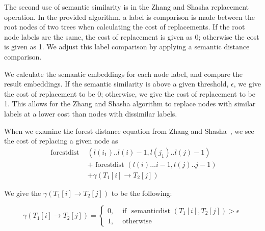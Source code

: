 The second use of semantic similarity is in the Zhang and Shasha replacement operation. In the provided algorithm, a label is comparison is made between the root nodes of two trees when calculating the cost of replacements. If the root node labels are the same, the cost of replacement is given as 0; otherwise the cost is given as 1. We adjust this label comparison by applying a semantic distance comparison.

We calculate the semantic embeddings for each node label, and compare the result embeddings. If the semantic similarity is above a given threshold, $\epsilon$, we give the cost of replacement to be 0; otherwise, we give the cost of replacement to be 1. This allows for the Zhang and Shasha algorithm to replace nodes with similar labels at a lower cost than nodes with dissimilar labels.

When we examine the forest distance equation from Zhang and Shasha~\cite{zhang_simple_1989}, we see the cost of replacing a given node as
\begin{align*}
    \text { forestdist } & \left(l\left(i_1\right) . . l(i)-1, l\left(j_1\right) . . l(j)-1\right) \\
                         & + \text { forestdist }(l(i) \ldots i-1, l(j) . . j-1)                   \\
                         & + \gamma\left(T_1[i] \rightarrow T_2[j]\right)
\end{align*}


We give the $\gamma\left(T_1[i] \rightarrow T_2[j]\right)$ to be the following:

\begin{equation*}
    \gamma\left(T_1[i] \rightarrow T_2[j]\right)=\left\{\begin{array}{ll}
        0, & \text { if } \text { semanticdist }\left(T_1[i], T_2[j]\right)>\epsilon \\
        1, & \text { otherwise }
    \end{array}\right.
\end{equation*}




